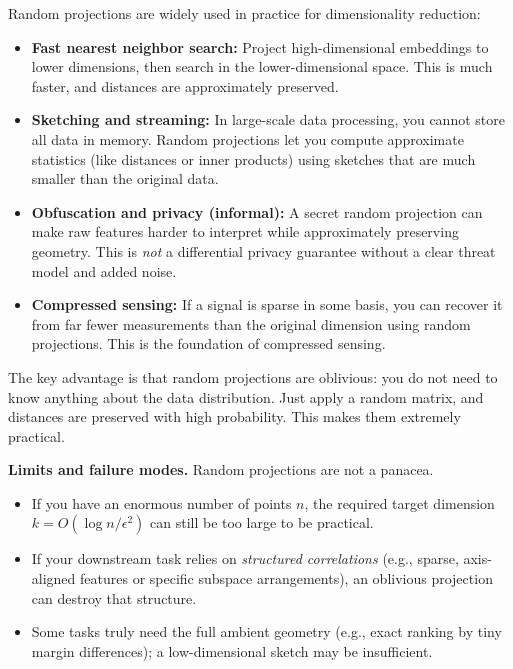 Random projections are widely used in practice for dimensionality reduction:

\begin{itemize}
\item \textbf{Fast nearest neighbor search:} Project high-dimensional embeddings to lower dimensions, then search in the lower-dimensional space. This is much faster, and distances are approximately preserved.

\item \textbf{Sketching and streaming:} In large-scale data processing, you cannot store all data in memory. Random projections let you compute approximate statistics (like distances or inner products) using sketches that are much smaller than the original data.

\item \textbf{Obfuscation and privacy (informal):} A secret random projection can make raw features harder to interpret while approximately preserving geometry. This is \emph{not} a differential privacy guarantee without a clear threat model and added noise.

\item \textbf{Compressed sensing:} If a signal is sparse in some basis, you can recover it from far fewer measurements than the original dimension using random projections. This is the foundation of compressed sensing.
\end{itemize}

\vspace{1em}

The key advantage is that random projections are oblivious: you do not need to know anything about the data distribution. Just apply a random matrix, and distances are preserved with high probability. This makes them extremely practical.

\vspace{2em}

\vspace{0.5em}

\textbf{Limits and failure modes.} Random projections are not a panacea.
\begin{itemize}
\item If you have an enormous number of points $n$, the required target dimension $k = O(\log n / \epsilon^2)$ can still be too large to be practical.
\item If your downstream task relies on \emph{structured correlations} (e.g., sparse, axis-aligned features or specific subspace arrangements), an oblivious projection can destroy that structure.
\item Some tasks truly need the full ambient geometry (e.g., exact ranking by tiny margin differences); a low-dimensional sketch may be insufficient.
\end{itemize}


